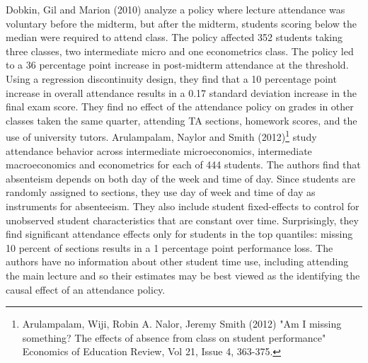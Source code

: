 \documentclass[12pt]{article}
\begin{document}
Dobkin, Gil and Marion (2010) analyze a policy where lecture attendance was voluntary before the midterm, but after the midterm, students scoring below the median were required to attend class. The policy affected 352 students taking three classes, two intermediate micro and one econometrics class.  The policy led to a 36 percentage point increase in post-midterm attendance at the threshold.  Using a regression discontinuity design, they find that a 10 percentage point increase in overall attendance results in a 0.17 standard deviation increase in the final exam score.  They find no effect of the attendance policy on grades in other classes taken the same quarter, attending TA sections, homework scores, and the use of university tutors. 
Arulampalam, Naylor and Smith (2012)\footnote{Arulampalam, Wiji, Robin A. Nalor, Jeremy Smith (2012) "Am I missing something? The effects of absence from class on student performance" Economics of Education Review, Vol 21, Issue 4, 363-375.} study attendance behavior across intermediate microeconomics, intermediate macroeconomics and econometrics for each of 444 students.  The authors find that absenteism depends on both day of the week and time of day.  Since students are randomly assigned to sections, they use day of week and time of day as instruments for absenteeism.  They also include student fixed-effects to control for unobserved student characteristics that are constant over time.  Surprisingly, they find significant attendance effects only for students in the top quantiles: missing 10 percent of sections results in a 1 percentage point performance loss.  The authors have no information about other student time use, including attending the main lecture and so their estimates may be best viewed as the identifying the causal effect of an attendance policy.
\end{document}
